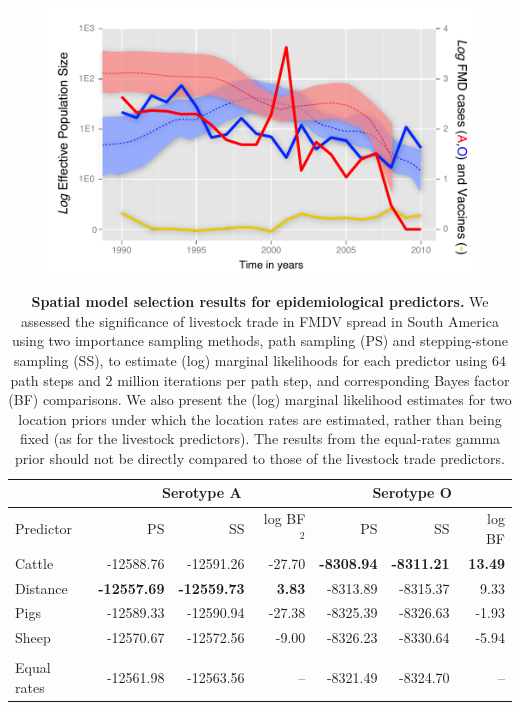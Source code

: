 \documentclass[10pt]{article}
\begin{document}
\newpage
\begin{figure}[H]
\begin{center}
\includegraphics[scale=1.0]{FIGURES/skyride.pdf}
\end{center}
\caption{}
\label{fig:skyride}
\end{figure}
\newpage
\begin{table}[H]
\caption{
\textbf{Spatial model selection results for epidemiological predictors.}
We assessed the significance of livestock trade in FMDV spread in South America using two importance sampling methods, path sampling (PS) and stepping-stone sampling (SS), to estimate (log) marginal likelihoods for each predictor using $64$ path steps and $2$ million iterations per path step, and corresponding Bayes factor (BF) comparisons.
We also present the (log) marginal likelihood estimates for two location priors under which the location rates are estimated, rather than being fixed (as for the livestock predictors).
The results from the equal-rates gamma prior should not be directly compared to those of the livestock trade predictors.
}
\begin{center}
\begin{tabular}{lrrrrrr}
\toprule
 & \multicolumn{3}{c}{Serotype A}& \multicolumn{3}{c}{Serotype O}\\
 \midrule
Predictor & PS & SS & log BF$^2$ & PS & SS & log BF \\
Cattle&-12588.76&-12591.26&-27.70&\textbf{-8308.94}&\textbf{-8311.21}& \textbf{13.49}\\
Distance&\textbf{-12557.69}&\textbf{-12559.73}&\textbf{3.83}&-8313.89&-8315.37&9.33\\
Pigs&-12589.33&-12590.94&-27.38&-8325.39&-8326.63&-1.93\\
Sheep&-12570.67&-12572.56&-9.00&-8326.23&-8330.64&-5.94\\
\\
\hline
Equal rates &-12561.98&-12563.56&--&-8321.49&-8324.70&--\\
\bottomrule
\end{tabular}
\end{center}
\begin{flushleft}
\end{flushleft}
\label{tab:preds}
 \end{table}
\end{document}
